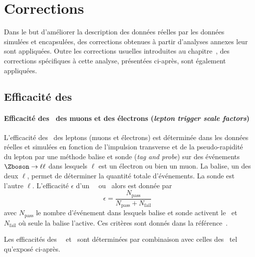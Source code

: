 \section{Corrections}\label{chapter-HTT_analysis-section-corrections}
Dans le but d'améliorer la description des données réelles par les données simulées et encapsulées, des corrections
obtenues à partir d'analyses annexes
leur sont appliquées.
Outre les corrections usuelles introduites au chapitre~,
des corrections spécifiques à cette analyse,
présentées ci-après,
sont également appliquées.
\subsection{Efficacité des \HLTpaths}
\paragraph{Efficacité des \HLTpaths\ des muons et des électrons (\emph{lepton trigger scale factors})}
L'efficacité des \HLTpaths\ des leptons (muons et électrons) est déterminée dans les données réelles et simulées en fonction de l'impulsion transverse et de la pseudo-rapidité du lepton
par une méthode \og balise et sonde \fg{} (\emph{tag and probe})
sur des événements $\Zboson\to\ell\ell$ \cite{CMS-NOTE-2020-014} dans lesquels $\ell$ est un électron ou bien un muon.
La balise, un des deux $\ell$, permet de déterminer la quantité totale d'événements.
La sonde est l'autre $\ell$.
L'efficacité $\epsilon$ d'un \HLTpath\ \HLTSingleEle\ ou \HLTSingleMu\ alors est donnée par
\begin{equation}
\epsilon = \frac{N_\text{pass}}{N_\text{pass}+N_\text{fail}}
\end{equation}
avec
$N_\text{pass}$ le nombre d'événement dans lesquels balise et sonde activent le \HLTpath\
et
$N_\text{fail}$ où seule la balise l'active.
Ces critères sont donnés dans la référence~\cite{CMS-NOTE-2020-014}.
\par
Les efficacités des \HLTpaths\ \HLTMuTauCross\ et \HLTEleTauCross\
sont déterminées par combinaison avec celles des \HLTSingleTau\ 
tel qu'exposé ci-après.
